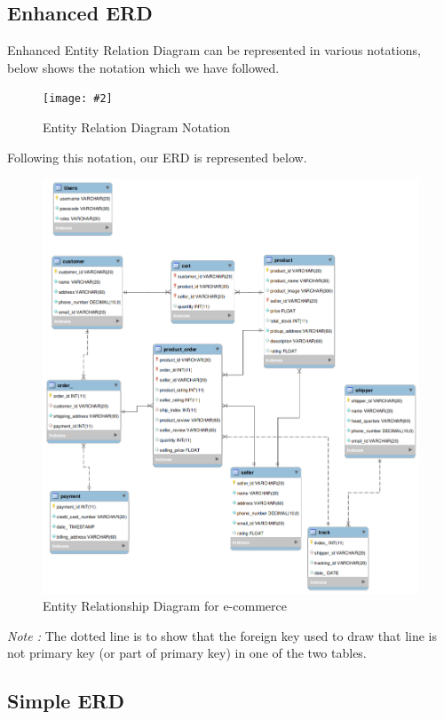 \documentclass[a4paper,12pt]{article}
\newcommand{\iph}[2]{
    \texttt{[image: \#2]}
}
\begin{document}
\subsection{Enhanced ERD}
Enhanced Entity Relation Diagram can be represented in various notations, below shows the notation which we have followed.


\begin{figure}[H]
    \centering
    \iph{0.5}{ERDNotation}
    \caption{Entity Relation Diagram Notation}
\end{figure}

Following this notation, our ERD is represented below.

\begin{figure}[H]
    \centering
    \includegraphics[width=1\textwidth]{ERDL} 
    \caption{Entity Relationship Diagram for e-commerce}
\end{figure}
\textit{Note :} The dotted line is to show that the foreign key used to draw that line is not primary key (or part of primary key) in one of the two tables.

\subsection{Simple ERD}
\end{document}
